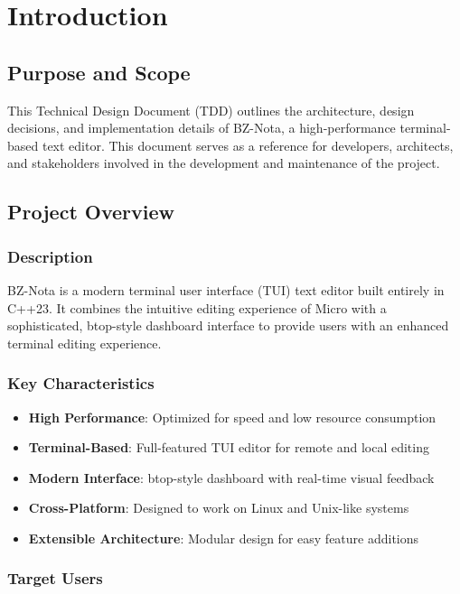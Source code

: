 \documentclass[12pt,a4paper,oneside,openany]{report}
\begin{document}
\chapter{Introduction}

\section{Purpose and Scope}

This Technical Design Document (TDD) outlines the architecture, design decisions, and implementation details of BZ-Nota, a high-performance terminal-based text editor. This document serves as a reference for developers, architects, and stakeholders involved in the development and maintenance of the project.

\section{Project Overview}

\subsection{Description}

BZ-Nota is a modern terminal user interface (TUI) text editor built entirely in C++23. It combines the intuitive editing experience of Micro with a sophisticated, btop-style dashboard interface to provide users with an enhanced terminal editing experience.

\subsection{Key Characteristics}

\begin{itemize}
	\item \textbf{High Performance}: Optimized for speed and low resource consumption
	\item \textbf{Terminal-Based}: Full-featured TUI editor for remote and local editing
	\item \textbf{Modern Interface}: btop-style dashboard with real-time visual feedback
	\item \textbf{Cross-Platform}: Designed to work on Linux and Unix-like systems
	\item \textbf{Extensible Architecture}: Modular design for easy feature additions
\end{itemize}

\subsection{Target Users}
\end{document}
